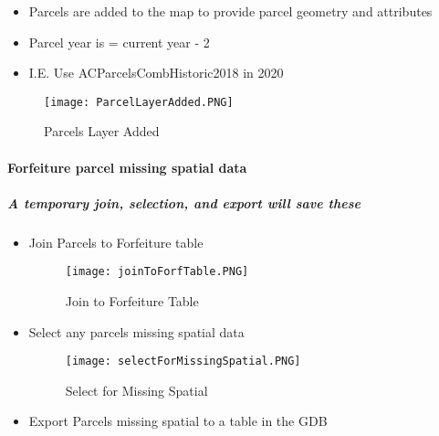  \begin{itemize}
 \item {Parcels are added to the map to provide parcel geometry and attributes}
 \item {Parcel year is = current year - 2}
 \item {I.E. Use ACParcelsCombHistoric2018 in 2020}
 \end{itemize}

 \vspace{.25in}

 \begin{figure}[h!]
 \centering
     \texttt{[image: ParcelLayerAdded.PNG]}
 \caption{Parcels Layer Added}
 \end{figure}
 \clearpage
 
 
 
 
 
 
 
  \paragraph{Forfeiture parcel missing spatial data}
  
  \subparagraph*{A temporary join, selection, and export will save these}
  
  \vspace{.3in}

 \begin{itemize}
 \item {Join Parcels to Forfeiture table}



 \begin{figure}[h!]
 \centering
     \texttt{[image: joinToForfTable.PNG]}
 \caption{Join to Forfeiture Table}
 \end{figure}
 \clearpage
 


 \item {Select any parcels missing spatial data}



 \begin{figure}[h!]
 \centering
     \texttt{[image: selectForMissingSpatial.PNG]}
 \caption{Select for Missing Spatial}
 \end{figure}

 \item {Export Parcels missing spatial to a table in the GDB}

 \end{itemize}
 
